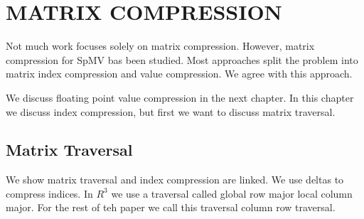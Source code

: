\chapter{MATRIX COMPRESSION}
\label{chapter:compression}
Not much work focuses solely on matrix compression. However, matrix compression for SpMV bas been studied. Most approaches split the problem into matrix index compression and value compression. We agree with this approach.
\par We discuss floating point value compression in the next chapter. In this chapter we discuss index compression, but first we want to discuss matrix traversal.
\section{Matrix Traversal}
We show matrix traversal and index compression are linked. We use deltas to compress indices. In $R^3$ we use a traversal called global row major local column major. For the rest of teh paper we call this traversal column row traversal.
